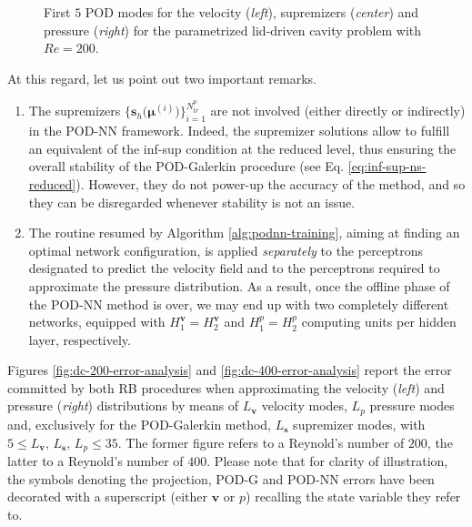 \documentclass[12pt, a4paper, twoside, openright, notitlepage]{report}
\numberwithin{equation}{chapter}
\theoremstyle{theorem}
\theoremstyle{definition}
\theoremstyle{remark}
\theoremstyle{proposition}
\numberwithin{figure}{chapter}
\newcommand{\bg}[1]{\boldsymbol{#1}}
\begin{document}
\begin{figure}[H]
			
			\caption{First $5$ POD modes for the velocity (\emph{left}), supremizers (\emph{center}) and pressure (\emph{right}) for the parametrized lid-driven cavity problem with $Re = 200$.}
			\label{fig:dc-modal-functions}
		\end{figure}
		
		\noindent At this regard, let us point out two important remarks.
		\begin{enumerate}[label=(\roman*)]
			\item The supremizers $\big\lbrace \mathbf{s}_h \big( \bg{\mu}^{(i)} \big) \big\rbrace_{i = 1}^{N_{tr}^p}$ are not involved (either directly or indirectly) in the POD-NN framework. Indeed, the supremizer solutions allow to fulfill an equivalent of the inf-sup condition at the reduced level, thus ensuring the overall stability of the POD-Galerkin procedure (see Eq. \eqref{eq:inf-sup-ns-reduced}). However, they do not power-up the accuracy of the method, and so they can be disregarded whenever stability is not an issue.
			\item The routine resumed by Algorithm \ref{alg:podnn-training}, aiming at finding an optimal network configuration, is applied \emph{separately} to the perceptrons designated to predict the velocity field and to the perceptrons required to approximate the pressure distribution. As a result, once the offline phase of the POD-NN method is over, we may end up with two completely different networks, equipped with $H_1^{\bg{v}} = H_2^{\bg{v}}$ and $H_1^p = H_2^p$ computing units per hidden layer, respectively.  
		\end{enumerate}
		Figures \ref{fig:dc-200-error-analysis} and \ref{fig:dc-400-error-analysis} report the error committed by both RB procedures when approximating the velocity (\emph{left}) and pressure (\emph{right}) distributions by means of $L_{\bg{v}}$ velocity modes, $L_p$ pressure modes and, exclusively for the POD-Galerkin method, $L_{\bg{s}}$ supremizer modes, with $5 \leq L_{\bg{v}}, \, L_{\bg{s}}, \, L_p \leq 35$. The former figure refers to a Reynold's number of $200$, the latter to a Reynold's number of $400$. Please note that for clarity of illustration, the symbols denoting the projection, POD-G and POD-NN errors have been decorated with a superscript (either $\bg{v}$ or $p$) recalling the state variable they refer to. 
						
\end{document}
